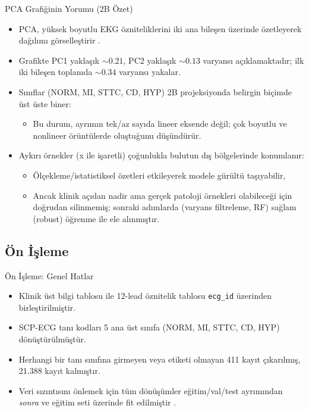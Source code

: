 \documentclass[aspectratio=169]{beamer}
\def\textbf#1{#1}%
\begin{document}
\begin{frame}{PCA Grafiğinin Yorumu (2B Özet)}
	\small
	\begin{itemize}
		\item PCA, yüksek boyutlu EKG özniteliklerini iki ana bileşen üzerinde özetleyerek dağılımı görselleştirir \cite{jolliffe2016-pca-review}.
		\item Grafikte \textbf{PC1} yaklaşık \(\sim 0.21\), \textbf{PC2} yaklaşık \(\sim 0.13\) varyansı açıklamaktadır; ilk iki bileşen toplamda \(\sim 0.34\) varyansı yakalar.
		\item Sınıflar (NORM, MI, STTC, CD, HYP) 2B projeksiyonda belirgin biçimde \textbf{üst üste biner}:
		\begin{itemize}
			\item Bu durum, ayrımın tek/az sayıda lineer eksende değil; \textbf{çok boyutlu ve nonlineer} örüntülerde oluştuğunu düşündürür.
		\end{itemize}
		\item \textbf{Aykırı örnekler} (x ile işaretli) çoğunlukla bulutun dış bölgelerinde konumlanır:
		\begin{itemize}
			\item Ölçekleme/istatistiksel özetleri etkileyerek modele gürültü taşıyabilir,
			\item Ancak klinik açıdan \textbf{nadir ama gerçek} patoloji örnekleri olabileceği için doğrudan silinmemiş; sonraki adımlarda (varyans filtreleme, RF) sağlam (robust) öğrenme ile ele alınmıştır.
		\end{itemize}
	\end{itemize}
\end{frame}


\subsection{Ön İşleme}

\begin{frame}{Ön İşleme: Genel Hatlar}
	\begin{itemize}
		\item Klinik üst bilgi tablosu ile 12-lead öznitelik tablosu \texttt{ecg\_id} üzerinden birleştirilmiştir.
		\item SCP-ECG tanı kodları 5 ana üst sınıfa (NORM, MI, STTC, CD, HYP) dönüştürülmüştür.
		\item Herhangi bir tanı sınıfına girmeyen veya etiketi olmayan 411 kayıt çıkarılmış, 21.388 kayıt kalmıştır.
		\item Veri sızıntısını önlemek için tüm dönüşümler eğitim/val/test ayrımından \emph{sonra} ve eğitim seti üzerinde fit edilmiştir \cite{kuhn2013-applied-predictive-modeling}.
	\end{itemize}
\end{frame}
\end{document}

